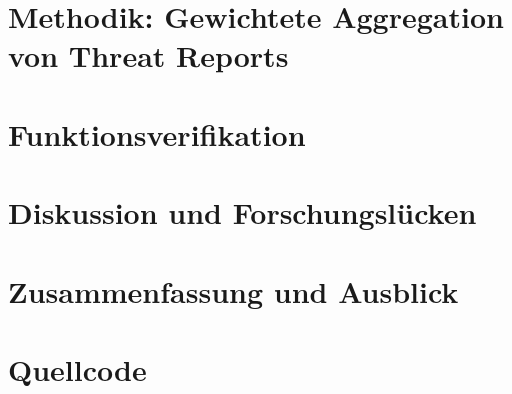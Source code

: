 \documentclass[]{thesisclass}
\begin{document}
\newpage

\chapter{Methodik: Gewichtete Aggregation von Threat Reports}
\label{chapter:methodik_gewichtete_agg_von_threat_reports}
	
	
	

\newpage

\chapter{Funktionsverifikation}
\label{chapter:evaluation}
	
	
\newpage

\chapter{Diskussion und Forschungslücken}
\label{chapter:diskussion_und_forschungsluecke}
	
	
	
\newpage
\chapter{Zusammenfassung und Ausblick}
\label{chapter:zusammenfassung_und_ausblick}
	
\newpage

\appendix

\chapter{Quellcode}






\end{document}
